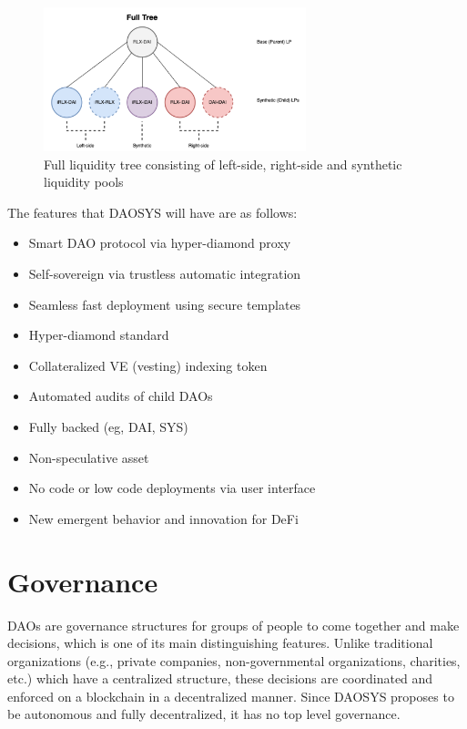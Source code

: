 \documentclass[journal,twocolumn,12pt]{ieeesyscoin}
\begin{document}
\begin{figure}[h!]
\includegraphics[width=3in]{img/lt.png}
\caption{Full liquidity tree consisting of left-side, right-side and synthetic liquidity pools} 
\label{fig:daosys_protocol}
\end{figure}

The features that DAOSYS will have are as follows:

\begin{itemize}
  \item Smart DAO protocol via hyper-diamond proxy
  \item Self-sovereign via trustless automatic integration
  \item Seamless fast deployment using secure templates
  \item Hyper-diamond standard
  \item Collateralized VE (vesting) indexing token
  \item Automated audits of child DAOs
  \item Fully backed (eg, DAI, SYS)
  \item Non-speculative asset
  \item No code or low code deployments via user interface
  \item New emergent behavior and innovation for DeFi
\end{itemize}  

\section{Governance}
\label{sec:governance}

DAOs are governance structures for groups of people to come together and make decisions, which is one of its main distinguishing features. Unlike traditional organizations (e.g., private companies, non-governmental organizations, charities, etc.) which have a centralized structure, these decisions are coordinated and enforced on a blockchain in a decentralized manner. Since DAOSYS proposes to be autonomous and fully decentralized, it has no top level governance.
\end{document}
